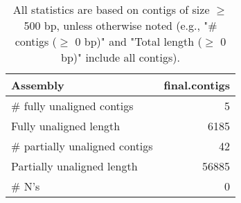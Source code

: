 \documentclass[12pt,a4paper]{article}
\begin{document}
\begin{table}[ht]
\begin{center}
\caption{All statistics are based on contigs of size $\geq$ 500 bp, unless otherwise noted (e.g., "\# contigs ($\geq$ 0 bp)" and "Total length ($\geq$ 0 bp)" include all contigs).}
\begin{tabular}{|l*{1}{|r}|}
\hline
Assembly & final.contigs \\ \hline
\# fully unaligned contigs & 5 \\ \hline
Fully unaligned length & 6185 \\ \hline
\# partially unaligned contigs & 42 \\ \hline
Partially unaligned length & 56885 \\ \hline
\# N's & 0 \\ \hline
\end{tabular}
\end{center}
\end{table}
\end{document}
